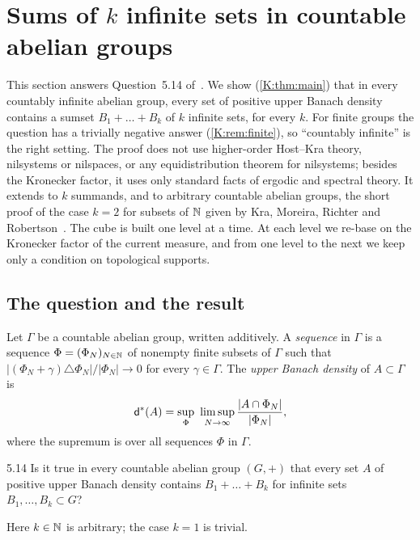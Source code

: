 \section{Sums of \texorpdfstring{$k$}{k} infinite sets in countable abelian groups}
\label{K:sec:main}

This section answers Question~5.14 of~\cite{kra2023problems}.
We show (\cref{K:thm:main}) that in every countably infinite abelian group, every set of
positive upper Banach density contains a sumset $B_1+\dots+B_k$ of $k$ infinite sets, for
every $k$.
For finite groups the question has a trivially negative answer (\cref{K:rem:finite}), so
``countably infinite'' is the right setting.
The proof does not use higher-order Host--Kra theory, nilsystems or nilspaces, or any
equidistribution theorem for nilsystems; besides the Kronecker factor, it uses only standard
facts of ergodic and spectral theory.
It extends to $k$ summands, and to arbitrary countable abelian groups, the short proof of
the case $k=2$ for subsets of $\mathbb{N}$ given by Kra, Moreira, Richter and
Robertson~\cite{kra2026short}.
The cube is built one level at a time.
At each level we re-base on the Kronecker factor of the current measure, and from one level
to the next we keep only a condition on topological supports.

\subsection{The question and the result}\label{K:ssec:result}

Let $\Gamma$ be a countable abelian group, written additively.
A \emph{\Fol{} sequence} in $\Gamma$ is a sequence $\Phi=(\Phi_N)_{N\in\mathbb{N}}$ of nonempty finite
subsets of $\Gamma$ such that $|(\Phi_N+\gamma)\triangle\Phi_N|/|\Phi_N|\to0$ for every
$\gamma\in\Gamma$.
The \emph{upper Banach density} of $A\subset\Gamma$ is
\[
\ubd(A)=\sup_{\Phi}\ \limsup_{N\to\infty}\frac{|A\cap\Phi_N|}{|\Phi_N|},
\]
where the supremum is over all \Fol{} sequences $\Phi$ in $\Gamma$.

\begin{question}{5.14}\label{K:q:514}
Is it true in every countable abelian group $(G,+)$ that every set $A$ of positive upper
Banach density contains $B_1+\dots+B_k$ for infinite sets $B_1,\dots,B_k\subset G$?
\end{question}

Here $k\in\mathbb{N}$ is arbitrary; the case $k=1$ is trivial.

